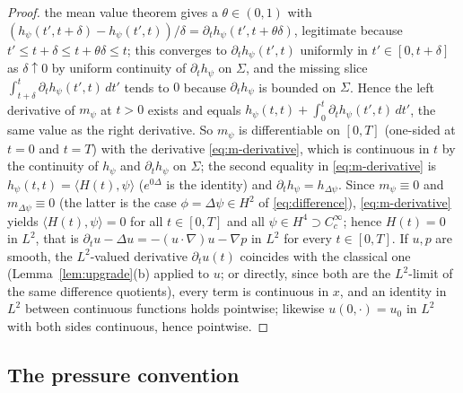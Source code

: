 \documentclass[11pt]{article}
\theoremstyle{definition}
\theoremstyle{plain}
\begin{document}
\begin{proof}
the mean value theorem gives a $\theta\in(0,1)$ with
$(h_\psi(t',t+\delta)-h_\psi(t',t))/\delta=\partial_th_\psi(t',t+\theta
\delta)$, legitimate because $t'\leq t+\delta\leq t+\theta\delta\leq t$;
this converges to $\partial_th_\psi(t',t)$ uniformly in $t'\in[0,t+\delta]$
as $\delta\uparrow0$ by uniform continuity of $\partial_th_\psi$ on
$\Sigma$, and the missing slice $\int_{t+\delta}^t\partial_th_\psi(t',t)
\,dt'$ tends to $0$ because $\partial_th_\psi$ is bounded on $\Sigma$.
Hence the left derivative of $m_\psi$ at $t>0$ exists and equals
$h_\psi(t,t)+\int_0^t\partial_th_\psi(t',t)\,dt'$, the same value as the
right derivative.  So $m_\psi$ is differentiable on $[0,T]$ (one-sided at
$t=0$ and $t=T$) with the derivative \eqref{eq:m-derivative}, which is
continuous in $t$ by the continuity of $h_\psi$ and $\partial_th_\psi$ on
$\Sigma$; the second equality in \eqref{eq:m-derivative} is
$h_\psi(t,t)=\langle H(t),\psi\rangle$ ($e^{0\Delta}$ is the identity) and
$\partial_th_\psi=h_{\Delta\psi}$.  Since $m_\psi\equiv0$ and
$m_{\Delta\psi}\equiv0$ (the latter is the case $\phi=\Delta\psi\in H^2$
of \eqref{eq:difference}), \eqref{eq:m-derivative} yields $\langle H(t),
\psi\rangle=0$ for all $t\in[0,T]$ and all $\psi\in H^4\supset
C_c^\infty$; hence $H(t)=0$ in $L^2$, that is $\partial_tu-\Delta u=
-(u\cdot\nabla)u-\nabla p$ in $L^2$ for every $t\in[0,T]$.  If $u,p$ are
smooth, the $L^2$-valued derivative $\partial_tu(t)$ coincides with the
classical one (Lemma~\ref{lem:upgrade}(b) applied to $u$; or directly,
since both are the $L^2$-limit of the same difference quotients), every
term is continuous in $x$, and an identity in $L^2$ between continuous
functions holds pointwise; likewise $u(0,\cdot)=u_0$ in $L^2$ with both
sides continuous, hence pointwise.
\end{proof}

\subsection{The pressure convention}
\end{document}
